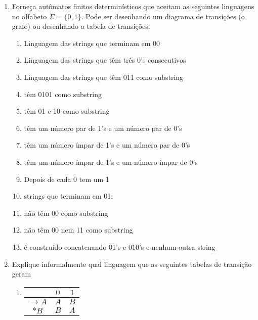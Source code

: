 \documentclass[12pt]{article}
\begin{document}
\begin{enumerate}

\item Forneça autômatos finitos determinísticos que aceitam as seguintes linguagens no alfabeto $\Sigma = \{0,1\}$. Pode ser desenhando um diagrama de transições (o grafo) ou desenhando a tabela de transições.

\begin{enumerate}

\item Linguagem das strings que terminam em 00

\item Linguagem das strings que têm três 0's consecutivos

\item Linguagem das strings que têm 011 como substring

\item têm 0101 como substring

\item têm 01 e 10 como substring

\item têm um número par de 1's e um número par de 0's

\item têm um número ímpar de 1's e um número par de 0's

\item têm um número ímpar de 1's e um número ímpar de 0's

\item Depois de cada 0 tem um 1

\item strings que terminam em 01:

\item não têm 00 como substring

\item não têm 00 nem 11 como substring

\item é construído concatenando 01's e 010's e nenhum outra string

\end{enumerate}


\item Explique informalmente qual linguagem que as seguintes tabelas de transição geram

\begin{enumerate}

\item 
\begin{tabular}{c||c|c}
                & $0$ & $1$  \\\hline\hline
$\rightarrow A$ & $A$ & $B$ \\
$          * B$ & $B$ & $A$ 
\end{tabular}


\end{enumerate}
\end{enumerate}
\end{document}
